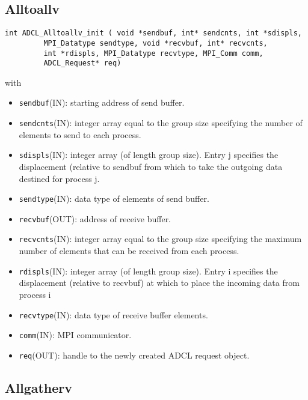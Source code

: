 {{\subsection{Alltoallv}

\begin{verbatim}
int ADCL_Alltoallv_init ( void *sendbuf, int* sendcnts, int *sdispls,
         MPI_Datatype sendtype, void *recvbuf, int* recvcnts, 
         int *rdispls, MPI_Datatype recvtype, MPI_Comm comm, 
         ADCL_Request* req)
\end{verbatim}
with
\begin{itemize}
\item {\tt sendbuf}(IN): starting address of send buffer.
\item {\tt sendcnts}(IN): integer array equal to the group size specifying the number of elements to send to each process.
\item {\tt sdispls}(IN): integer array (of length group size). Entry j specifies the displacement (relative to sendbuf from which to take the outgoing data destined for process j.
\item {\tt sendtype}(IN): data type of elements of send buffer.
\item {\tt recvbuf}(OUT): address of receive buffer.
\item {\tt recvcnts}(IN): integer array equal to the group size specifying the maximum number of elements that can be received from each process.
\item {\tt rdispls}(IN): integer array (of length group size). Entry i specifies the displacement (relative to recvbuf) at which to place the incoming data from process i
\item {\tt recvtype}(IN): data type of receive buffer elements.
\item {\tt comm}(IN): MPI communicator.
\item {\tt req}(OUT): handle to the newly created ADCL request object.
\end{itemize}

\subsection{Allgatherv}

}}
